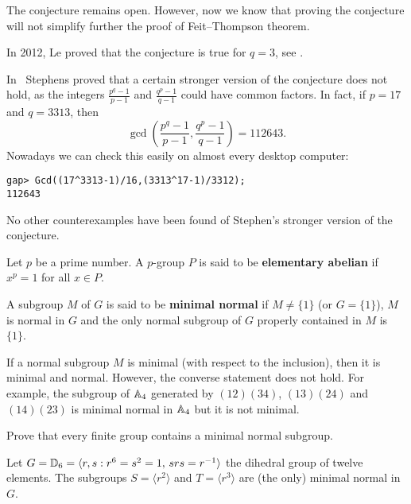 The conjecture remains open. However, now we know that 
proving the conjecture will not simplify further
the proof of Feit--Thompson theorem. 

In 2012, Le proved that the conjecture is true for $q=3$, see 
\cite{MR2900154}. 

In~\cite{MR297686} 
Stephens proved that a certain stronger version of the conjecture 
does not hold, as the integers 
$\frac {p^{q}-1}{p-1}$ and $\frac{q^{p} - 1}{q - 1}$ 
could have common factors. In fact, if $p=17$ and $q=3313$, 
then 
\[
\gcd\left(\frac {p^{q}-1}{p-1},\frac{q^{p} - 1}{q - 1}\right)=112643.
\]
Nowadays we can check this easily on almost every desktop computer:
\begin{lstlisting}
gap> Gcd((17^3313-1)/16,(3313^17-1)/3312);
112643
\end{lstlisting}
No other counterexamples have been found of Stephen’s 
stronger version of the conjecture.

\begin{definition}
Let $p$ be a prime number. A $p$-group $P$ is said to be 
\textbf{elementary abelian} if $x^p=1$ for all $x\in P$.
\end{definition}

\begin{definition}
A subgroup $M$ of $G$ is said to be \textbf{minimal normal} if $M\ne\{1\}$
(or $G = \{1\}$),
$M$ is normal in $G$ and the only normal 
subgroup of $G$ properly contained in $M$ is $\{1\}$. 
\end{definition}

\begin{example}
    If a normal subgroup $M$ is minimal (with respect to the inclusion), 
    then it is minimal and normal. However, 
    the converse statement does not hold. For example, the subgroup
    of $\mathbb{A}_4$ generated by $(12)(34)$, $(13)(24)$ and $(14)(23)$ is minimal normal in $\mathbb{A}_4$ 
    but it is not minimal. 
\end{example}

\begin{exercise}
Prove that every finite group contains a minimal normal subgroup. 
\end{exercise}

\begin{example}
    Let $G=\mathbb{D}_{6}=\langle r,s:r^6=s^2=1,\,srs=r^{-1}\rangle$ the dihedral group of twelve elements. The subgroups
    $S=\langle r^2\rangle$ 
    and $T=\langle r^3\rangle$ are (the only) minimal normal in $G$.
\end{example}

